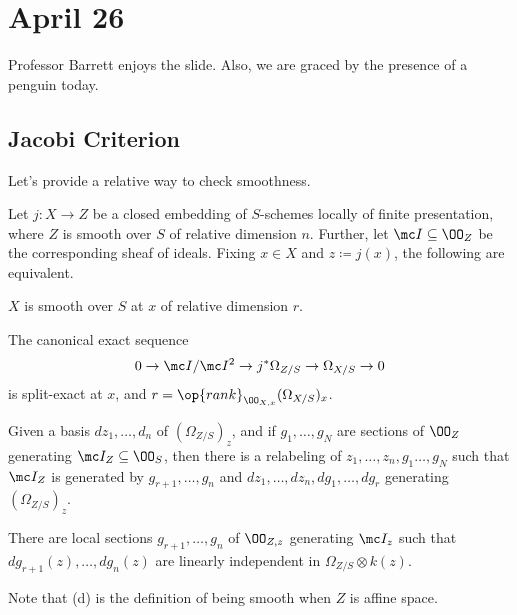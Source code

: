 \documentclass[../notes.tex]{subfiles}
\begin{document}
\section{April 26}

Professor Barrett enjoys the slide. Also, we are graced by the presence of a penguin today.

\subsection{Jacobi Criterion}
Let's provide a relative way to check smoothness.
\begin{proposition}
	Let $j\colon X\to Z$ be a closed embedding of $S$-schemes locally of finite presentation, where $Z$ is smooth over $S$ of relative dimension $n$. Further, let $\mc I\subseteq\OO_Z$ be the corresponding sheaf of ideals. Fixing $x\in X$ and $z\coloneqq j(x)$, the following are equivalent.
	\begin{listalph}
		\item $X$ is smooth over $S$ at $x$ of relative dimension $r$.
		\item The canonical exact sequence
		\[0\to\mc I/\mc I^2\to j^*\Omega_{Z/S}\to\Omega_{X/S}\to0\]
		is split-exact at $x$, and $r=\op{rank}_{\OO_{X,x}}(\Omega_{X/S})_x$.
		\item Given a basis $dz_1,\ldots,d_n$ of $(\Omega_{Z/S})_z$, and if $g_1,\ldots,g_N$ are sections of $\OO_Z$ generating $\mc I_Z\subseteq\OO_S$, then there is a relabeling of $z_1,\ldots,z_n,g_1\ldots,g_N$ such that $\mc I_Z$ is generated by $g_{r+1},\ldots,g_n$ and $dz_1,\ldots,dz_n,dg_1,\ldots,dg_r$ generating $(\Omega_{Z/S})_z$.
		\item There are local sections $g_{r+1},\ldots,g_n$ of $\OO_{Z,z}$ generating $\mc I_z$ such that $dg_{r+1}(z),\ldots,dg_n(z)$ are linearly independent in $\Omega_{Z/S}\otimes k(z)$.
	\end{listalph}
\end{proposition}
Note that (d) is the definition of being smooth when $Z$ is affine space.
\end{document}
